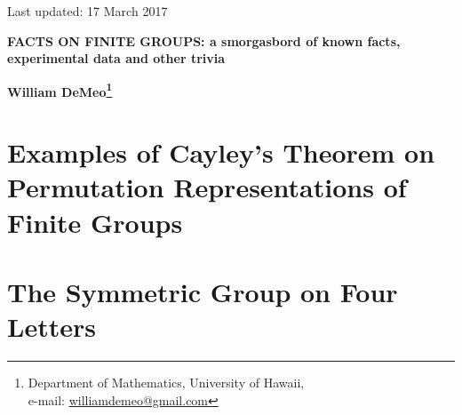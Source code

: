 \begin{flushright}
\vspace*{-1.1cm} {{\small \sffamily Last updated: 17 March 2017}}
\end{flushright}
\vspace{0.8cm}
\begin{center}
  {\large \bf FACTS ON FINITE GROUPS: a smorgasbord of known facts, experimental data and other trivia
} \vspace*{3mm}


{\bf William DeMeo\footnote{Department of Mathematics, University of Hawaii,\\
    e-mail: \href{mailto:williamdemeo@gmail.com}{williamdemeo@gmail.com}}}
\end{center}

\begin{abstract}
  We present here a rough and unpolished collection of potentially useful facts
  about finite groups, most (if not all) of which are well known. Much of this information
  appeared in disparate notes from research seminars, and the author received requests
  to collect this information and post it somewhere for reference and so that it may be easily
  cited in other works.  With this purpose in mind, the proper BibTeX data are displayed on the
  last page below.
\end{abstract}



\section{Examples of Cayley's Theorem on Permutation Representations of Finite Groups}
\label{sec:introduction}



\section{The Symmetric Group on Four Letters}


